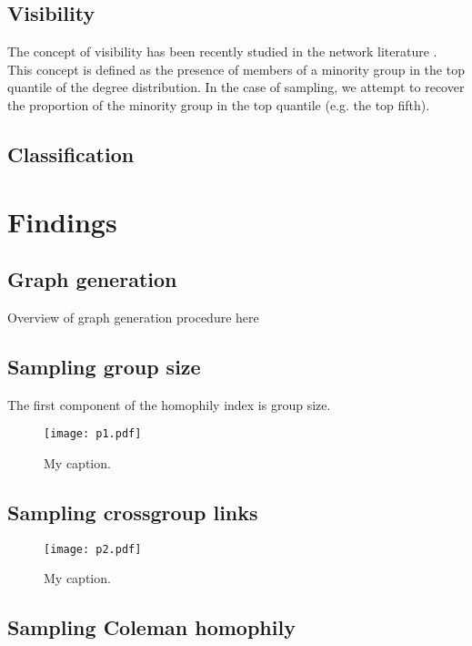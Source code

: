 \documentclass[a4paper]{article}
\begin{document}
\subsection{Visibility}

The concept of visibility has been recently studied in the network literature \cite{karimi_visibility_2017, wagner_sampling_2017}. This concept is defined as the presence of members of a minority group in the top quantile of the degree distribution. In the case of sampling, we attempt to recover the proportion of the minority group in the top  quantile (e.g. the top fifth).


\subsection{Classification}

\section{Findings}

\subsection{Graph generation}

Overview of graph generation procedure here

\subsection{Sampling group size}

The first component of the homophily index is group size.

\begin{figure}[h!]
	\texttt{[image: p1.pdf]}
	\centering
	\caption{My caption.}
\end{figure}

\subsection{Sampling crossgroup links}

\begin{figure}[h!]
	\texttt{[image: p2.pdf]}
	\centering
	\caption{My caption.}
\end{figure}

\subsection{Sampling Coleman homophily}
\end{document}
